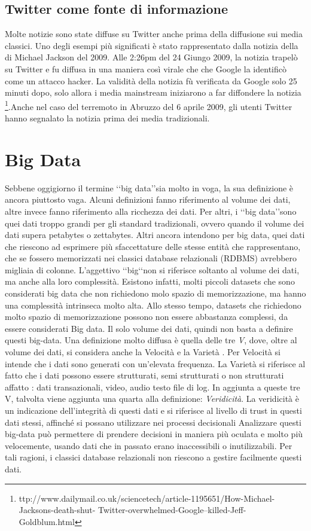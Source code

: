 \subsection{Twitter come fonte di informazione}
Molte notizie sono state diffuse su Twitter anche prima della diffusione sui media classici. Uno degli esempi più significati è stato rappresentato dalla notizia della di Michael Jackson del 2009. Alle 2:26pm
del 24 Giungo 2009, la notizia trapelò su Twitter e fu diffusa in una maniera così virale che che Google la identificò come un attacco hacker. La validità della notizia fù verificata da Google solo 25 minuti dopo,   solo allora i media mainstream iniziarono a far diffondere la notizia \footnote{ttp://www.dailymail.co.uk/sciencetech/article-1195651/How-Michael-Jacksons-death-shut-
Twitter-overwhelmed-Google–killed-Jeff-Goldblum.html}.Anche nel caso del terremoto in Abruzzo del 6 aprile 2009, gli utenti Twitter hanno segnalato la notizia prima dei media tradizionali. 
\section{Big Data}
Sebbene oggigiorno il termine \lq\lq big data\rq\rq sia molto in voga, la sua definizione è ancora piuttosto vaga. Alcuni definizioni fanno riferimento al volume dei dati, altre  invece fanno riferimento alla ricchezza dei dati. Per altri, i \lq\lq big data\rq\rq sono   quei dati troppo grandi per gli standard tradizionali, ovvero quando il volume dei dati supera petabytes o zettabytes. Altri ancora intendono per big data, quei dati che riescono ad esprimere più sfaccettature delle stesse entità che rappresentano, che se fossero memorizzati nei classici database relazionali (RDBMS) avrebbero migliaia di colonne. 
L'aggettivo \lq\lq big\lq\lq non si riferisce soltanto al volume dei dati, ma anche alla loro complessità. Esistono infatti, molti piccoli datasets che  sono considerati big data che non richiedono molo spazio di memorizzazione, ma hanno una complessità intrinseca molto alta. Allo stesso tempo, datasets che richiedono molto spazio di memorizzazione possono non essere abbastanza complessi, da essere considerati Big data. Il solo volume dei dati, quindi non basta a definire questi big-data. Una definizione molto diffusa è quella delle tre \emph{V}, dove, oltre al volume dei dati, si considera anche la Velocità e la Varietà .
Per Velocità si intende che i dati sono generati con un'elevata frequenza.
La Varietà si riferisce al fatto che i dati possono essere  strutturati, semi strutturati o non strutturati affatto : dati transazionali, video, audio testo file di log.
In aggiunta a queste tre V, talvolta viene aggiunta una quarta alla definizione: \emph{Veridicità}.
La veridicità è un indicazione dell'integrità di questi dati e si riferisce al livello di trust in questi dati stessi, affinché si possano utilizzare nei processi decisionali
Analizzare questi big-data può permettere  di prendere decisioni in maniera più oculata e molto più velocemente, usando dati che in passato erano inaccessibili o inutilizzabili.
Per tali ragioni, i classici database relazionali non riescono a gestire facilmente questi dati.
